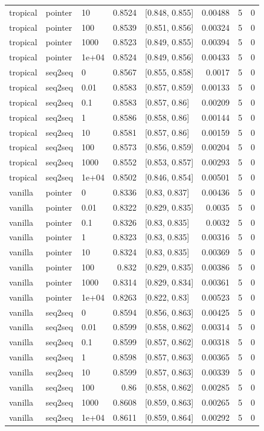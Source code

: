 \documentclass[10pt]{article}
\begin{document}
{\begin{longtable}{lllrlrrr}
tropical & pointer & 10 & 0.8524 & [0.848, 0.855] & 0.00488 & 5 & 0\\
tropical & pointer & 100 & 0.8539 & [0.851, 0.856] & 0.00324 & 5 & 0\\
tropical & pointer & 1000 & 0.8523 & [0.849, 0.855] & 0.00394 & 5 & 0\\
tropical & pointer & 1e+04 & 0.8524 & [0.849, 0.856] & 0.00433 & 5 & 0\\
tropical & seq2seq & 0 & 0.8567 & [0.855, 0.858] & 0.0017 & 5 & 0\\
tropical & seq2seq & 0.01 & 0.8583 & [0.857, 0.859] & 0.00133 & 5 & 0\\
tropical & seq2seq & 0.1 & 0.8583 & [0.857, 0.86] & 0.00209 & 5 & 0\\
tropical & seq2seq & 1 & 0.8586 & [0.858, 0.86] & 0.00144 & 5 & 0\\
tropical & seq2seq & 10 & 0.8581 & [0.857, 0.86] & 0.00159 & 5 & 0\\
tropical & seq2seq & 100 & 0.8573 & [0.856, 0.859] & 0.00204 & 5 & 0\\
tropical & seq2seq & 1000 & 0.8552 & [0.853, 0.857] & 0.00293 & 5 & 0\\
tropical & seq2seq & 1e+04 & 0.8502 & [0.846, 0.854] & 0.00501 & 5 & 0\\
vanilla & pointer & 0 & 0.8336 & [0.83, 0.837] & 0.00436 & 5 & 0\\
vanilla & pointer & 0.01 & 0.8322 & [0.829, 0.835] & 0.0035 & 5 & 0\\
vanilla & pointer & 0.1 & 0.8326 & [0.83, 0.835] & 0.0032 & 5 & 0\\
vanilla & pointer & 1 & 0.8323 & [0.83, 0.835] & 0.00316 & 5 & 0\\
vanilla & pointer & 10 & 0.8324 & [0.83, 0.835] & 0.00369 & 5 & 0\\
vanilla & pointer & 100 & 0.832 & [0.829, 0.835] & 0.00386 & 5 & 0\\
vanilla & pointer & 1000 & 0.8314 & [0.829, 0.834] & 0.00361 & 5 & 0\\
vanilla & pointer & 1e+04 & 0.8263 & [0.822, 0.83] & 0.00523 & 5 & 0\\
vanilla & seq2seq & 0 & 0.8594 & [0.856, 0.863] & 0.00425 & 5 & 0\\
vanilla & seq2seq & 0.01 & 0.8599 & [0.858, 0.862] & 0.00314 & 5 & 0\\
vanilla & seq2seq & 0.1 & 0.8599 & [0.857, 0.862] & 0.00318 & 5 & 0\\
vanilla & seq2seq & 1 & 0.8598 & [0.857, 0.863] & 0.00365 & 5 & 0\\
vanilla & seq2seq & 10 & 0.8599 & [0.857, 0.863] & 0.00339 & 5 & 0\\
vanilla & seq2seq & 100 & 0.86 & [0.858, 0.862] & 0.00285 & 5 & 0\\
vanilla & seq2seq & 1000 & 0.8608 & [0.859, 0.863] & 0.00265 & 5 & 0\\
vanilla & seq2seq & 1e+04 & 0.8611 & [0.859, 0.864] & 0.00292 & 5 & 0\\
\bottomrule
\end{longtable}
}
\end{document}
